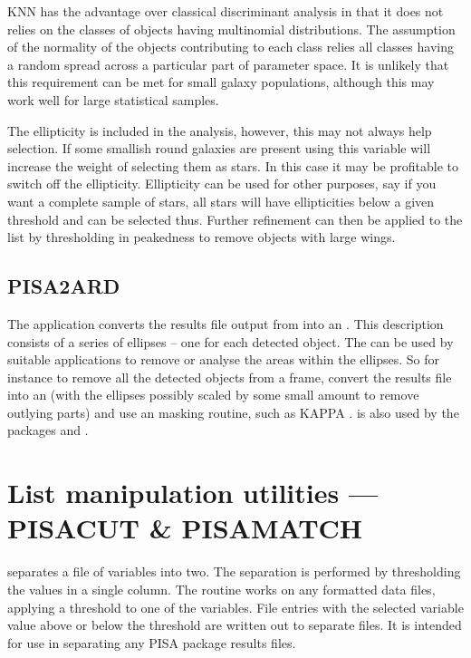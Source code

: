 KNN has the advantage over classical discriminant analysis in that it
does not relies on the classes of objects having multinomial
distributions. The assumption of the normality of the objects
contributing to each class relies all classes having a random spread
across a particular part of parameter space. It is unlikely that this
requirement can be met for small galaxy populations, although this may
work well for large statistical samples.

The ellipticity is included in the analysis, however, this may not
always help selection. If some smallish round galaxies are present using
this variable will increase the weight of selecting them as stars. In
this case it may be profitable to switch off the ellipticity.
Ellipticity can be used for other purposes, say if you want a complete
sample of stars, all stars will have ellipticities below a given
threshold and can be selected thus. Further refinement can then be
applied to the list by thresholding in peakedness to remove objects with
large wings.

\subsection{PISA2ARD}

The  application converts the results file output from
 into an . This description
consists of a series of ellipses -- one for each detected object. The
 can be
used by suitable applications to remove or analyse the areas within the
ellipses. So for instance to remove all the detected objects from a
frame, convert the results file into an 
(with the ellipses possibly scaled by some small amount to remove outlying
parts) and use an  masking routine, such as
KAPPA . 
is also used by the packages  and
.

\section{List manipulation utilities --- PISACUT \& PISAMATCH}
 separates a file of variables into two. The separation is
performed by thresholding the values in a single column. The routine
works on any formatted data files, applying a threshold to one of the
variables. File entries with the selected variable value above or below
the threshold are written out to separate files. It is intended for use
in separating any PISA package results files.

